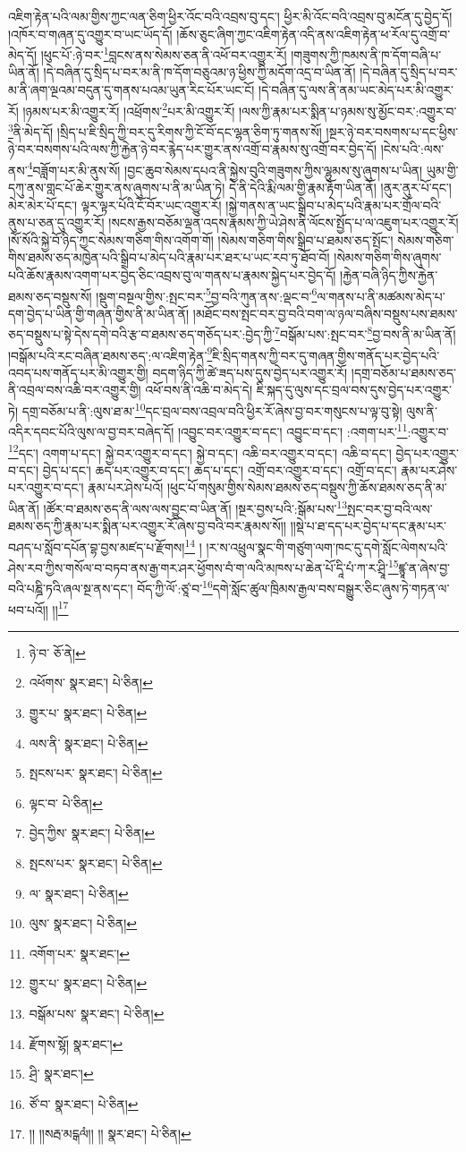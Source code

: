 འཇིག་རྟེན་པའི་ལམ་གྱིས་ཀྱང་ལན་ཅིག་ཕྱིར་འོང་བའི་འབྲས་བུ་དང་། ཕྱིར་མི་འོང་བའི་འབྲས་བུ་མངོན་དུ་བྱེད་དོ། །འཁོར་བ་གཞན་དུ་འགྱུར་བ་ཡང་ཡོད་དོ། །ཆོས་ཅུང་ཞིག་ཀྱང་འཇིག་རྟེན་འདི་ནས་འཇིག་རྟེན་ཕ་རོལ་དུ་འགྲོ་བ་མེད་དོ། །ཕུང་པོ་:ཉེ་བར་\footnote{ཉེ་བ་  ཅོ་ནེ། }བླངས་ནས་སེམས་ཅན་ནི་འཕོ་བར་འགྱུར་རོ། །གཟུགས་ཀྱི་ཁམས་ནི་ཁ་དོག་བཞི་པ་ཡིན་ནོ། །དེ་བཞིན་དུ་སྲིད་པ་བར་མ་ནི་ཁ་དོག་བཅུའམ་ཉ་ཕྱིས་ཀྱི་མདོག་འདྲ་བ་ཡིན་ནོ། །དེ་བཞིན་དུ་སྲིད་པ་བར་མ་ནི་ཞག་ལྔའམ་བདུན་དུ་གནས་པའམ་ཡུན་རིང་པོར་ཡང་ངོ། །དེ་བཞིན་དུ་ལས་ནི་ནམ་ཡང་མེད་པར་མི་འགྱུར་རོ། །ཉམས་པར་མི་འགྱུར་རོ། །འཕྲོགས་\footnote{འཕོགས་  སྣར་ཐང་།  པེ་ཅིན། }པར་མི་འགྱུར་རོ། །ལས་ཀྱི་རྣམ་པར་སྨིན་པ་ཉམས་སུ་མྱོང་བར་:འགྱུར་བ་\footnote{གྱུར་པ་  སྣར་ཐང་།  པེ་ཅིན། }ནི་མེད་དོ། །སྲིད་པ་ཇི་སྲིད་ཀྱི་བར་དུ་རིགས་ཀྱི་ངོ་བོ་དང་ལྷན་ཅིག་ཏུ་གནས་སོ། །སྔར་ཉེ་བར་བསགས་པ་དང་ཕྱིས་ཉེ་བར་བསགས་པའི་ལས་ཀྱི་རྐྱེན་ཉེ་བར་རྙེད་པར་གྱུར་ནས་འགྲོ་བ་རྣམས་སུ་འགྲོ་བར་བྱེད་དོ། །ངེས་པའི་:ལས་ནས་\footnote{ལས་ནི་  སྣར་ཐང་།  པེ་ཅིན། }བཟློག་པར་མི་ནུས་སོ། །བྱང་ཆུབ་སེམས་དཔའ་ནི་སྐྱེས་བུའི་གཟུགས་ཀྱིས་ལྷུམས་སུ་ཞུགས་པ་ཡིན། ཡུམ་གྱི་དཀུ་ནས་གླང་པོ་ཆེར་གྱུར་ནས་ཞུགས་པ་ནི་མ་ཡིན་ཏེ། དེ་ནི་དེའི་རྨི་ལམ་གྱི་རྣམ་རྟོག་ཡིན་ནོ། །ནུར་ནུར་པོ་དང་། མེར་མེར་པོ་དང་། ལྟར་ལྟར་པོའི་ངོ་བོར་ཡང་འགྱུར་རོ། །སྐྱེ་གནས་ན་ཡང་སྒྲིབ་པ་མེད་པའི་རྣམ་པར་གྲོལ་བའི་ནུས་པ་ཅན་དུ་འགྱུར་རོ། །སངས་རྒྱས་བཅོམ་ལྡན་འདས་རྣམས་ཀྱི་ཡེ་ཤེས་ནི་ལོངས་སྤྱོད་པ་ལ་འཇུག་པར་འགྱུར་རོ། །སོ་སོའི་སྐྱེ་བོ་ཉིད་ཀྱང་སེམས་གཅིག་གིས་འགོག་གོ། །སེམས་གཅིག་གིས་སྒྲིབ་པ་ཐམས་ཅད་སྤོང་། སེམས་གཅིག་གིས་ཐམས་ཅད་མཁྱེན་པའི་སྒྲིབ་པ་མེད་པའི་རྣམ་པར་ཐར་པ་ཡང་རབ་ཏུ་ཐོབ་བོ། །སེམས་གཅིག་གིས་ཞུགས་པའི་ཆོས་རྣམས་འགག་པར་བྱེད་ཅིང་འབྲས་བུ་ལ་གནས་པ་རྣམས་སྐྱེད་པར་བྱེད་དོ། །རྐྱེན་བཞི་ཉིད་ཀྱིས་རྐྱེན་ཐམས་ཅད་བསྡུས་སོ། །སྡུག་བསྔལ་གྱིས་:སྤང་བར་\footnote{སྤངས་པར་  སྣར་ཐང་།  པེ་ཅིན། }བྱ་བའི་ཀུན་ནས་:ལྡང་བ་\footnote{ལྟང་བ་  པེ་ཅིན། }ལ་གནས་པ་ནི་མཚམས་མེད་པ་དག་བྱེད་པ་ཡིན་གྱི་གཞན་གྱིས་ནི་མ་ཡིན་ནོ། །མཐོང་བས་སྤང་བར་བྱ་བའི་བག་ལ་ཉལ་བཞིས་བསྡུས་པས་ཐམས་ཅད་བསྡུས་པ་སྟེ་དེས་དགེ་བའི་རྩ་བ་ཐམས་ཅད་གཅོད་པར་:བྱེད་ཀྱི་\footnote{བྱེད་ཀྱིས་  སྣར་ཐང་།  པེ་ཅིན། }བསྒོམ་པས་:སྤང་བར་\footnote{སྤངས་པར་  སྣར་ཐང་།  པེ་ཅིན། }བྱ་བས་ནི་མ་ཡིན་ནོ། །བསྒོམ་པའི་རང་བཞིན་ཐམས་ཅད་:ལ་འཇིག་རྟེན་\footnote{ལ་  སྣར་ཐང་།  པེ་ཅིན། }ཇི་སྲིད་གནས་ཀྱི་བར་དུ་གཞན་གྱིས་གནོད་པར་བྱེད་པའི་འབད་པས་གནོད་པར་མི་འགྱུར་གྱི། བདག་ཉིད་ཀྱི་ཚེ་ཟད་པས་དུས་བྱེད་པར་འགྱུར་རོ། །དགྲ་བཅོམ་པ་ཐམས་ཅད་ནི་འབྲལ་བས་འཆི་བར་འགྱུར་གྱི། འཕོ་བས་ནི་འཆི་བ་མེད་དེ། ཇི་སྐད་དུ་ལུས་དང་བྲལ་བས་དུས་བྱེད་པར་འགྱུར་ཏེ། དགྲ་བཅོམ་པ་ནི་:ལུས་ཐ་མ་\footnote{ལུས་  སྣར་ཐང་།  པེ་ཅིན། }དང་བྲལ་བས་འབྲལ་བའི་ཕྱིར་རོ་ཞེས་བྱ་བར་གསུངས་པ་ལྟ་བུ་སྟེ། ལུས་ནི་འདིར་དབང་པོའི་ལུས་ལ་བྱ་བར་བཞེད་དོ། །འབྱུང་བར་འགྱུར་བ་དང་། འབྱུང་བ་དང་། :འགག་པར་\footnote{འགོག་པར་  སྣར་ཐང་། }:འགྱུར་བ་\footnote{གྱུར་པ་  སྣར་ཐང་།  པེ་ཅིན། }དང་། འགག་པ་དང་། སྐྱེ་བར་འགྱུར་བ་དང་། སྐྱེ་བ་དང་། འཆི་བར་འགྱུར་བ་དང་། འཆི་བ་དང་། བྱེད་པར་འགྱུར་བ་དང་། བྱེད་པ་དང་། ཆད་པར་འགྱུར་བ་དང་། ཆད་པ་དང་། འགྲོ་བར་འགྱུར་བ་དང་། འགྲོ་བ་དང་། རྣམ་པར་ཤེས་པར་འགྱུར་བ་དང་། རྣམ་པར་ཤེས་པའོ། །ཕུང་པོ་གསུམ་གྱིས་སེམས་ཐམས་ཅད་བསྡུས་ཀྱི་ཆོས་ཐམས་ཅད་ནི་མ་ཡིན་ནོ། །ཚོར་བ་ཐམས་ཅད་ནི་ལས་ལས་བྱུང་བ་ཡིན་ནོ། །སྔར་བྱས་པའི་:སྒོམ་པས་\footnote{བསྒོམ་པས་  སྣར་ཐང་།  པེ་ཅིན། }སྤང་བར་བྱ་བའི་ལས་ཐམས་ཅད་ཀྱི་རྣམ་པར་སྨིན་པར་འགྱུར་རོ་ཞེས་བྱ་བའི་བར་རྣམས་སོ།། །།སྡེ་པ་ཐ་དད་པར་བྱེད་པ་དང་རྣམ་པར་བཤད་པ་སློབ་དཔོན་བྷ་བྱས་མཛད་པ་རྫོགས།\footnote{རྫོགས་སྷོ།  སྣར་ཐང་། } ། །ར་ས་འཕྲུལ་སྣང་གི་གཙུག་ལག་ཁང་དུ་དགེ་སློང་ལེགས་པའི་ཤེས་རབ་ཀྱིས་གསོལ་བ་བཏབ་ནས་རྒྱ་གར་ཤར་ཕྱོགས་བཾ་ག་ལའི་མཁས་པ་ཆེན་པོ་དཱི་པཾ་ཀ་ར་ཤྲཱི་\footnote{ཤྲི་  སྣར་ཐང་། }ཛྙཱ་ན་ཞེས་བྱ་བའི་པཎྜི་ཏའི་ཞལ་སྔ་ནས་དང་། བོད་ཀྱི་ལོ་:ཙཱ་བ་\footnote{ཙོ་བ་  སྣར་ཐང་།  པེ་ཅིན། }དགེ་སློང་ཚུལ་ཁྲིམས་རྒྱལ་བས་བསྒྱུར་ཅིང་ཞུས་ཏེ་གཏན་ལ་ཕབ་པའོ།། །།\footnote{།། །།སརྦ་མངྒལཾ།། །།  སྣར་ཐང་།  པེ་ཅིན། }